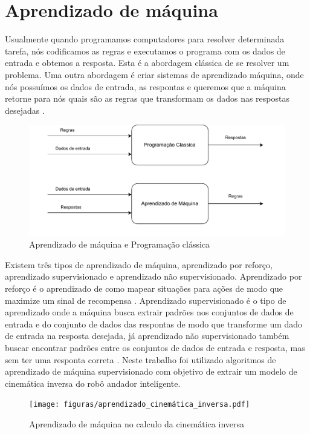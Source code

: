 \section{Aprendizado de máquina}
Usualmente quando programamos computadores para
resolver determinada tarefa, nós codificamos as regras e
executamos o programa com os dados de entrada e obtemos a resposta.
Esta é a abordagem clássica de se resolver um problema. Uma outra abordagem
é criar sistemas de aprendizado máquina, onde nós possuímos os
dados de entrada, as respontas e queremos que a máquina retorne
para nós quais são as regras que transformam os dados nas respostas
desejadas \cite{chollet2021deep}.

\begin{figure}[H]
    \centering
    \includegraphics[scale=0.7]{figuras/machine_learning_diagram.pdf}
    \caption{Aprendizado de máquina e Programação clássica}
\end{figure}

Existem três tipos de aprendizado de máquina, aprendizado por reforço,
aprendizado supervisionado e aprendizado não supervisionado.
Aprendizado por reforço é o aprendizado de como mapear situações
para ações de modo que maximize um sinal de recompensa
\cite{sutton2018reinforcement}. Aprendizado supervisionado é o
tipo de aprendizado onde a máquina busca extrair padrões nos conjuntos
de dados de entrada  e do conjunto de dados das respontas de modo que
transforme um dado de entrada na resposta desejada, já aprendizado não
supervisionado também buscar encontrar padrões entre os conjuntos de
dados de entrada e resposta, mas sem ter uma responta correta
\cite{trask2019grokking}. Neste trabalho foi utilizado algoritmos de
aprendizado de máquina supervisionado com objetivo de extrair um modelo de
cinemática inversa do robô andador inteligente.

\begin{figure}[H]
    \centering
    \texttt{[image: figuras/aprendizado\_cinemática\_inversa.pdf]}
    \caption{Aprendizado de máquina no calculo da cinemática inversa}
\end{figure}

